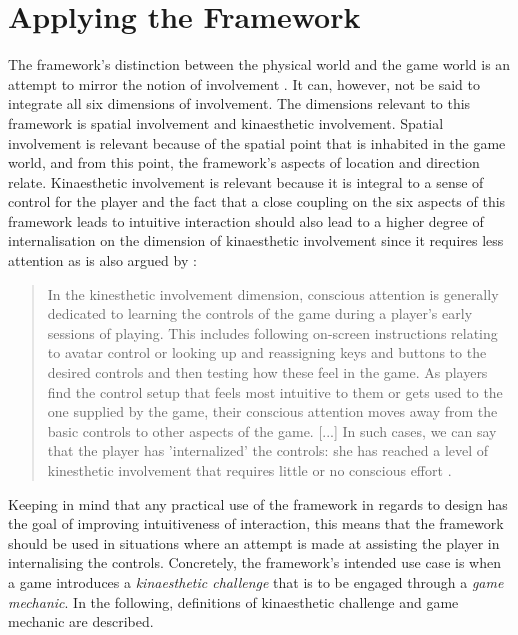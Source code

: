 \section{Applying the Framework}
The framework's distinction between the physical world and the game world is an attempt to mirror the notion of involvement \cite{calleja}. It can, however, not be said to integrate all six dimensions of involvement. The dimensions relevant to this framework is spatial involvement and kinaesthetic involvement. Spatial involvement is relevant because of the spatial point that is inhabited in the game world, and from this point, the framework's aspects of location and direction relate. Kinaesthetic involvement is relevant because it is integral to a sense of control for the player and the fact that a close coupling on the six aspects of this framework leads to intuitive interaction \cite{frogger} should also lead to a higher degree of internalisation on the dimension of kinaesthetic involvement since it requires less attention as is also argued by \cite{calleja}:
\begin{quote}
  In the kinesthetic involvement dimension, conscious attention is generally dedicated to learning the controls of the game during a player’s early sessions of playing. This includes following on-screen instructions relating to avatar control or looking up and reassigning keys and buttons to the desired controls and then testing how these feel in the game. As players find the control setup that feels most intuitive to them or gets used to the one supplied by the game, their conscious attention moves away from the basic controls to other aspects of the game. [...] In such cases, we can say that the player has 'internalized' the controls: she has reached a level of kinesthetic involvement that requires little or no conscious effort \cite[p. 45]{calleja}.
\end{quote}
Keeping in mind that any practical use of the framework in regards to design has the goal of improving intuitiveness of interaction, this means that the framework should be used in situations where an attempt is made at assisting the player in internalising the controls. Concretely, the framework's intended use case is when a game introduces a \textit{kinaesthetic challenge} that is to be engaged through a \textit{game mechanic}. In the following, definitions of kinaesthetic challenge and game mechanic are described.

